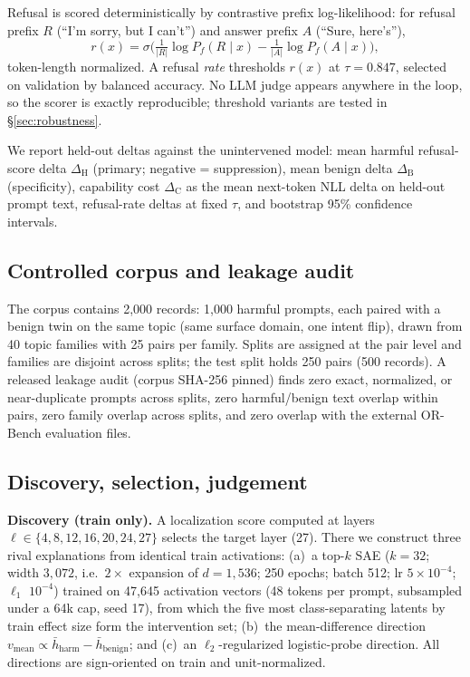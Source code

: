 \documentclass[11pt]{article}
\newcommand{\dH}{\ensuremath{\Delta_{\mathrm{H}}}}
\newcommand{\dB}{\ensuremath{\Delta_{\mathrm{B}}}}
\newcommand{\dC}{\ensuremath{\Delta_{\mathrm{C}}}}
\begin{document}
Refusal is scored deterministically by contrastive prefix log-likelihood: for
refusal prefix $R$ (``I'm sorry, but I can't'') and answer prefix $A$
(``Sure, here's''),
\begin{equation}
r(x)=\sigma\!\Big(
\tfrac{1}{|R|}\log P_f(R\mid x)-
\tfrac{1}{|A|}\log P_f(A\mid x)\Big),
\label{eq:score}
\end{equation}
token-length normalized.  A refusal \emph{rate} thresholds $r(x)$ at
$\tau=0.847$, selected on validation by balanced accuracy.  No LLM judge
appears anywhere in the loop, so the scorer is exactly reproducible; threshold
variants are tested in \S\ref{sec:robustness}.

We report held-out deltas against the unintervened model: mean harmful
refusal-score delta \dH{} (primary; negative = suppression), mean benign delta
\dB{} (specificity), capability cost \dC{} as the mean next-token NLL delta on
held-out prompt text, refusal-rate deltas at fixed $\tau$, and bootstrap 95\%
confidence intervals.

\subsection{Controlled corpus and leakage audit}
\label{sec:corpus}

The corpus contains 2{,}000 records: 1{,}000 harmful prompts, each paired with
a benign twin on the same topic (same surface domain, one intent flip), drawn
from 40 topic families with 25 pairs per family.  Splits are assigned at the
pair level and families are disjoint across splits; the test split holds 250
pairs (500 records).  A released leakage audit (corpus SHA-256 pinned) finds
zero exact, normalized, or near-duplicate prompts across splits, zero
harmful/benign text overlap within pairs, zero family overlap across splits,
and zero overlap with the external OR-Bench evaluation files.

\subsection{Discovery, selection, judgement}
\label{sec:walls}

\textbf{Discovery (train only).}  A localization score computed at layers
$\ell\in\{4,8,12,16,20,24,27\}$ selects the target layer (27).  There we
construct three rival explanations from identical train activations:
(a)~a top-$k$ SAE ($k=32$; width $3{,}072$, i.e.\ $2\times$ expansion of
$d=1{,}536$; 250 epochs; batch 512; lr $5\times10^{-4}$; $\ell_1$
$10^{-4}$) trained on 47{,}645 activation vectors (48 tokens per prompt,
subsampled under a 64k cap, seed 17), from which the five most
class-separating latents by train effect size form the intervention set;
(b)~the mean-difference direction
$v_{\mathrm{mean}}\propto\bar h_{\mathrm{harm}}-\bar h_{\mathrm{benign}}$; and
(c)~an $\ell_2$-regularized logistic-probe direction.  All directions are
sign-oriented on train and unit-normalized.
\end{document}
